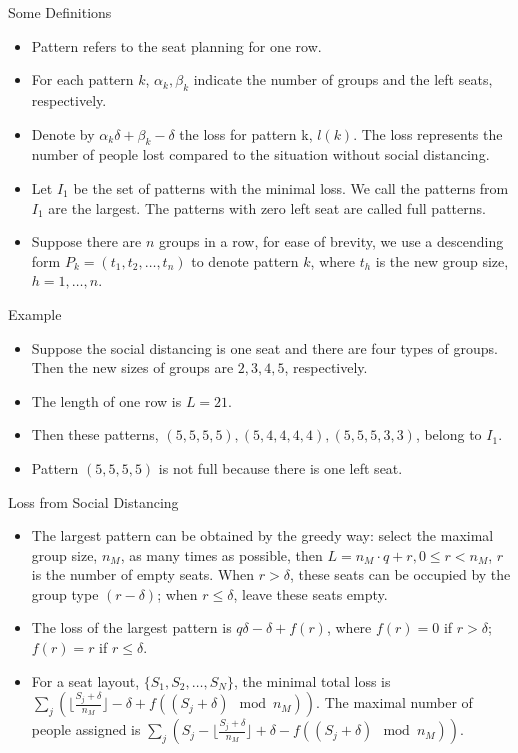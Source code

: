   \begin{frame}{Some Definitions}
    \begin{itemize}
      \item Pattern refers to the seat planning for one row.
      \item For each pattern $k$, $\alpha_k, \beta_k$ indicate the number of groups and the left seats, respectively.
      \item Denote by $\alpha_k \delta + \beta_k - \delta$ the loss for pattern k, $l(k)$. The loss represents the number of people lost compared to the situation without social distancing.
      \item Let $I_1$ be the set of patterns with the minimal loss. We call the patterns from $I_1$ are the largest. The patterns with zero left seat are called full patterns.
      \item Suppose there are $n$ groups in a row, for ease of brevity, we use a descending form $P_{k} = (t_1, t_2, \ldots, t_n)$ to denote pattern $k$, where $t_h$ is the new group size, $h = 1,\ldots, n$.
    \end{itemize}
  \end{frame}

  \begin{frame}{Example}
    \begin{itemize}
      \item Suppose the social distancing is one seat and there are four types of groups. Then the new sizes of groups are $2, 3, 4, 5$, respectively. 
      \item The length of one row is $L = 21$.
      \item Then these patterns, $(5, 5, 5, 5), (5, 4, 4, 4, 4),(5, 5, 5, 3, 3)$, belong to $I_1$.
      \item Pattern $(5, 5, 5, 5)$ is not full because there is one left seat.
    \end{itemize}
  \end{frame}

  \begin{frame}{Loss from Social Distancing}
    \begin{itemize}
      \item The largest pattern can be obtained by the greedy way: select the maximal group size, $n_{M}$, as many times as possible, then $L = n_{M} \cdot q + r, 0 \leq r < n_{M}$, $r$ is the number of empty seats. When $r > \delta$, these seats can be occupied by the group type $(r-\delta)$; when $r \leq \delta$, leave these seats empty.
      \item The loss of the largest pattern is $q \delta -\delta + f(r)$, where $f(r) =0$ if $r > \delta$; $f(r) = r$ if $r \leq \delta$.
      \item For a seat layout, $\{S_1, S_2, \ldots, S_{N}\}$, the minimal total loss is $\sum_{j} (\lfloor \frac{S_j+\delta}{n_{M}} \rfloor -\delta + f((S_j + \delta) \mod n_{M}))$. The maximal number of people assigned is $\sum_{j} (S_j - \lfloor \frac{S_j+\delta}{n_{M}} \rfloor + \delta - f((S_j +\delta)\mod n_{M}))$.
    \end{itemize}
  \end{frame}
  
